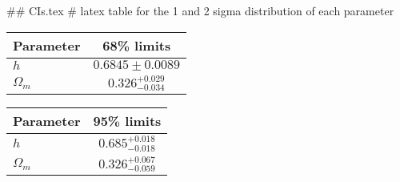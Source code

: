## CIs.tex
# latex table for the 1 and 2 sigma distribution of each parameter

\begin{tabular} { l  c}
 Parameter &  68\% limits\\
\hline
{\boldmath$h              $} & $0.6845\pm 0.0089          $\\
{\boldmath$\Omega_m       $} & $0.326^{+0.029}_{-0.034}   $\\
\hline
\end{tabular}

\begin{tabular} { l  c}
 Parameter &  95\% limits\\
\hline
{\boldmath$h              $} & $0.685^{+0.018}_{-0.018}   $\\
{\boldmath$\Omega_m       $} & $0.326^{+0.067}_{-0.059}   $\\
\hline
\end{tabular}

